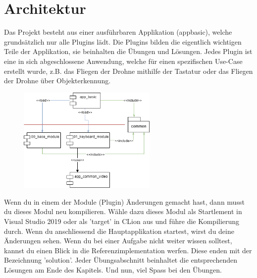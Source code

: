 \section{Architektur}
Das Projekt besteht aus einer ausführbaren Applikation (app\textunderscore basic), welche grundsätzlich nur alle \glspl{Plugin} lädt.
Die Plugins bilden die eigentlich wichtigen Teile der Applikation, sie beinhalten die Übungen und Lösungen.
Jedes Plugin ist eine in sich abgeschlossene Anwendung, welche für einen spezifischen Use-Case erstellt wurde, z.B.
das Fliegen der Drohne mithilfe der Tastatur oder das Fliegen der Drohne über Objekterkennung.
\begin{figure}[H]
    \centering
    \includegraphics[width=0.6\textwidth]{../common/chapter_01/resources/02_architecture.png}
\end{figure}
Wenn du in einem der Module (Plugin) Änderungen gemacht hast, dann musst du dieses Modul neu kompilieren. Wähle
dazu dieses Modul als Startlement in Visual Studio 2019 oder als 'target' in CLion aus und führe die Kompilierung
durch. Wenn du anschliessend die Hauptapplikation startest, wirst du deine Änderungen sehen.
Wenn du bei einer Aufgabe nicht weiter wissen solltest, kannst du einen Blick in die Referenzimplementation werfen.
Diese enden mit der Bezeichnung '\textunderscore solution'. Jeder Übungsabschnitt beinhaltet die entsprechenden
Lösungen am Ende des Kapitels.
Und nun, viel Spass bei den Übungen.